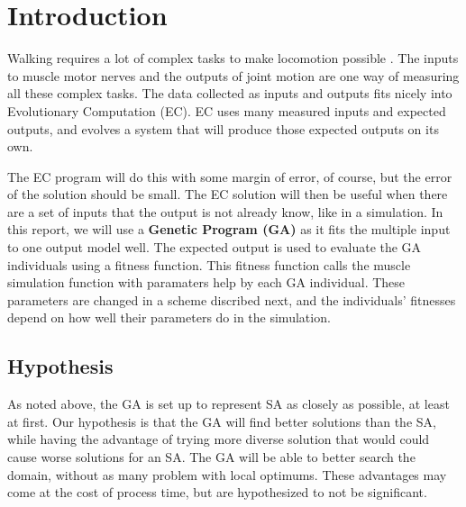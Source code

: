 \section{Introduction}
Walking requires a lot of complex tasks to make locomotion possible 
\cite{mcgowan}. The inputs to muscle motor nerves and the outputs of joint
motion are one way of measuring all these complex tasks. The data collected
as inputs and outputs fits nicely into Evolutionary Computation (EC). EC uses 
many measured inputs and expected outputs, and evolves a system that will 
produce those expected outputs on its own. 

The EC program will do this with some margin of error, of course, but the 
error of the solution should be small. The EC solution will then be useful 
when there are a set of inputs that the output is not already know, like in 
a simulation. In this report, we will use a \textbf{Genetic Program (GA)} as
it fits the multiple input to one output model well. The expected output is 
used to evaluate the GA individuals using a fitness function. This fitness 
function calls the muscle simulation function with paramaters help by each
GA individual. These parameters are changed in a scheme discribed next, and
the individuals' fitnesses depend on how well their parameters do in the 
simulation.

\subsection{Hypothesis}
As noted above, the GA is set up to represent SA as closely as possible,
at least at first. Our hypothesis is that the GA will find better solutions
than the SA, while having the advantage of trying more diverse solution that
would could cause worse solutions for an SA. The GA will be able to better
search the domain, without as many problem with local optimums. These 
advantages may come at the cost of process time, but are hypothesized to 
not be significant.
